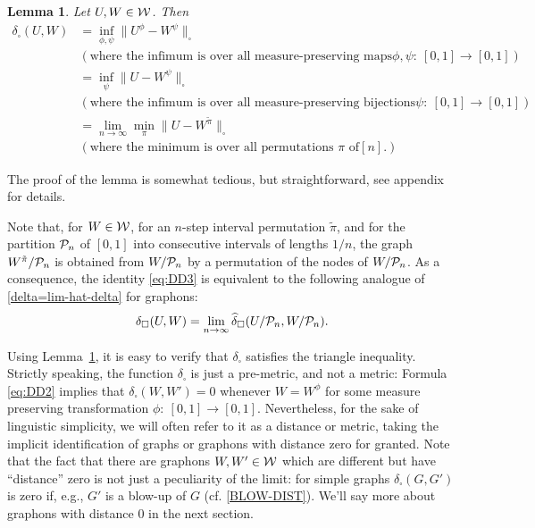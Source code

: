 \documentclass[12pt]{article}
\newtheorem{lemma}[theorem]{Lemma}
\numberwithin{equation}{section}
\def\iv{\widehat}
\def\PP{{\cal P}}\def\QQ{{\cal Q}}\def\RR{{\cal R}}
\begin{document}
\begin{lemma}
\label{lem:delta=delta} Let $U,W\in {\cal W}$. Then
\begin{align}
\delta_\square(U,W)
&=\inf_{\phi,\psi}\|U^\phi-W^\psi\|_\square\label{eq:DD1}\\
&(\text{where the infimum is over all measure-preserving maps
$\phi,\psi:~[0,1]\to[0,1]$})\nonumber\\
&=\inf_{\psi}\|U-W^\psi\|_\square\label{eq:DD2}\\
&(\text{where the infimum is over all measure-preserving bijections
$\psi:~[0,1]\to[0,1]$})\nonumber\\
&=\lim_{n\to\infty}\min_{\pi}\|U-W^{\tilde{\pi}}\|_\square\label{eq:DD3}\\
&(\text{where the minimum is over all permutations $\pi$ of
$[n]$.})\nonumber
\end{align}
\end{lemma}

The proof of the lemma is somewhat tedious, but straightforward,
see appendix for details.

Note that, for $W\in{\cal W}$, for an $n$-step interval permutation
$\tilde{\pi}$, and for the partition $\PP_n$ of $[0,1]$ into
consecutive intervals of lengths $1/n$, the graph
$W^{\tilde{\pi}}/\PP_n$ is obtained from $W/\PP_n$ by a permutation
of the nodes of $W/\PP_n$.  As a consequence, the identity
\eqref{eq:DD3} is equivalent to the following analogue of
\eqref{delta=lim-hat-delta} for graphons:
\begin{equation}
\delta_\square(U,W)=
\lim_{n\to\infty}\iv\delta_\square(U/\PP_n,W/\PP_n).
\end{equation}

Using Lemma~\ref{lem:delta=delta}, it is easy to verify that
$\delta_\square$ satisfies the triangle inequality. Strictly
speaking, the function $\delta_\square$ is just a pre-metric, and not
a metric: Formula \eqref{eq:DD2} implies that
$\delta_\square(W,W')=0$ whenever $W=W^\phi$ for some measure
preserving transformation $\phi:~[0,1]\to[0,1]$. Nevertheless, for
the sake of linguistic simplicity, we will often refer to it as a
distance or metric, taking the implicit identification of graphs or
graphons with distance zero for granted. Note that the fact that
there are graphons $W,W'\in{\cal W}$ which are different but have
``distance'' zero is not just a peculiarity of the limit: for simple
graphs $\delta_\square(G,G')$ is zero if, e.g., $G'$ is a blow-up of
$G$ (cf. \eqref{BLOW-DIST}). We'll say more about graphons with
distance $0$ in the next section.
\end{document}
